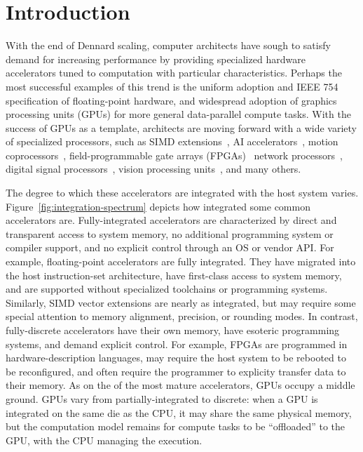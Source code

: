 
\chapter{Introduction}


With the end of Dennard scaling, computer architects have sough to satisfy demand for increasing performance by providing specialized hardware accelerators tuned to computation with particular characteristics.
Perhaps the most successful examples of this trend is the uniform adoption and IEEE 754 specification of floating-point hardware, and widespread adoption of graphics processing units (GPUs) for more general data-parallel compute tasks.
With the success of GPUs as a template, architects are moving forward with a wide variety of specialized processors, such as
SIMD extensions~,
AI accelerators~,
motion coprocessors~,
field-programmable gate arrays (FPGAs)~
network processors~,
digital signal processors~,
vision processing units~,
and many others.


The degree to which these accelerators are integrated with the host system varies.
Figure~\ref{fig:integration-spectrum} depicts how integrated some common accelerators are.
Fully-integrated accelerators are characterized by direct and transparent access to system memory, no additional programming system or compiler support, and no explicit control through an OS or vendor API.
For example, floating-point accelerators are fully integrated.
They have migrated into the host instruction-set architecture, have first-class access to system memory, and are supported without specialized toolchains or programming systems.
Similarly, SIMD vector extensions are nearly as integrated, but may require some special attention to memory alignment, precision, or rounding modes.
In contrast, fully-discrete accelerators have their own memory, have esoteric programming systems, and demand explicit control.
For example, FPGAs are programmed in hardware-description languages, may require the host system to be rebooted to be reconfigured, and often require the programmer to explicity transfer data to their memory.
As on the of the most mature accelerators, GPUs occupy a middle ground.
GPUs vary from partially-integrated to discrete: when a GPU is integrated on the same die as the CPU, it may share the same physical memory, but the computation model remains for compute tasks to be ``offloaded'' to the GPU, with the CPU managing the execution.

